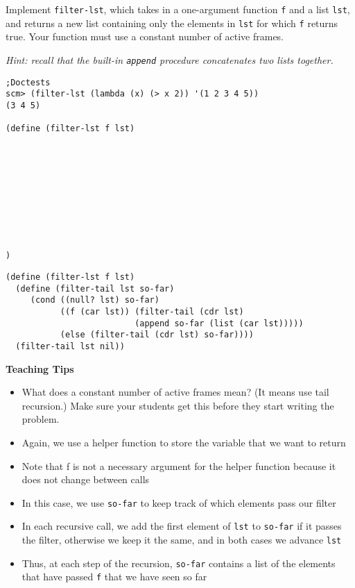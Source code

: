 \begin{blocksection}

\question Implement \lstinline{filter-lst}, which takes in a one-argument function \lstinline{f} and
a list \lstinline{lst}, and returns a new list containing only the elements in \texttt{lst}
for which \texttt{f} returns true. Your function must use a constant number of active frames.

\textit{Hint: recall that the built-in \lstinline{append} procedure concatenates two lists together. }

\begin{lstlisting}
;Doctests
scm> (filter-lst (lambda (x) (> x 2)) '(1 2 3 4 5))
(3 4 5)

(define (filter-lst f lst)










)
\end{lstlisting}

\begin{solution}[0.5in]
\begin{lstlisting}
(define (filter-lst f lst)
  (define (filter-tail lst so-far)
     (cond ((null? lst) so-far)
           ((f (car lst)) (filter-tail (cdr lst)
                          (append so-far (list (car lst)))))
           (else (filter-tail (cdr lst) so-far))))
  (filter-tail lst nil))
\end{lstlisting}
\end{solution}

\end{blocksection}

\begin{guide}
\begin{blocksection}
\textbf{Teaching Tips}
  \begin{itemize}
    \item What does a constant number of active frames mean? (It means use tail recursion.) Make sure your students get this before they start writing the problem. 
    \item Again, we use a helper function to store the variable that we want to return
    \item Note that f is not a necessary argument for the helper function because it does not change between calls
    \item In this case, we use \lstinline{so-far} to keep track of which elements pass our filter
    \item In each recursive call, we add the first element of \lstinline{lst} to \lstinline{so-far} if it passes the filter, otherwise we keep it the same, and in both cases we advance \lstinline{lst}
    \item Thus, at each step of the recursion, \lstinline{so-far} contains a list of the elements that have passed \lstinline{f} that we have seen so far
  \end{itemize}
\end{blocksection}
\end{guide}
